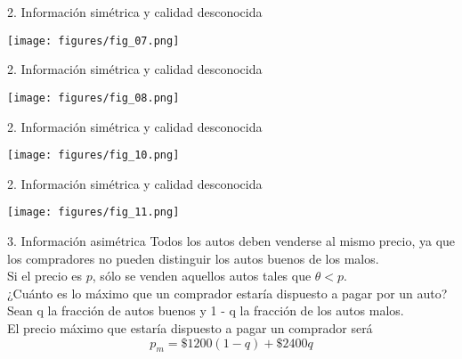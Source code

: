 \begin{frame}{2. Información simétrica y calidad desconocida}
	\begin{center}
		\texttt{[image: figures/fig\_07.png]}
	\end{center}
\end{frame}
\begin{frame}{2. Información simétrica y calidad desconocida}
	\begin{center}
		\texttt{[image: figures/fig\_08.png]}
	\end{center}
\end{frame}
\begin{frame}{2. Información simétrica y calidad desconocida}
	\begin{center}
		\texttt{[image: figures/fig\_10.png]}
	\end{center}
\end{frame}
\begin{frame}{2. Información simétrica y calidad desconocida}
	\begin{center}
		\texttt{[image: figures/fig\_11.png]}
	\end{center}
\end{frame}
\begin{frame}{3. Información asimétrica}
	Todos los autos deben venderse al mismo precio, ya que los compradores no pueden distinguir los autos buenos de los malos.\\[0.3cm]
	
	Si el precio es $p$, sólo se venden aquellos autos tales que $\theta < p$.\\[0.3cm]
	
	¿Cuánto es lo máximo que un comprador estaría dispuesto a pagar por
	un auto?\\[0.3cm]
	
	Sean q la fracción de autos buenos y 1 - q la fracción de los autos malos.\\[0.3cm]
	
	El precio máximo que estaría dispuesto a pagar un comprador será
		$$p_m = \$1200(1-q)+\$2400q$$
\end{frame}
